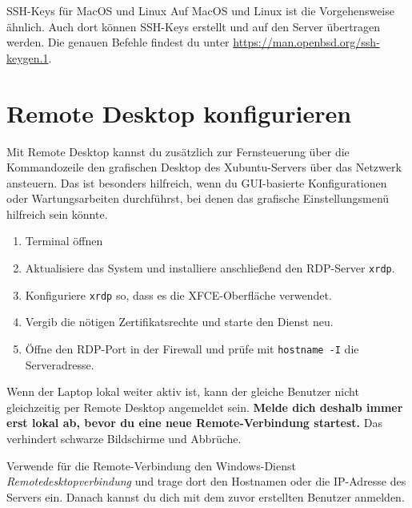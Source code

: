 \begin{InfoBox}{SSH-Keys für MacOS und Linux}
    \scriptsize Auf MacOS und Linux ist die Vorgehensweise ähnlich. Auch dort können SSH-Keys erstellt und auf den Server übertragen werden. Die genauen Befehle findest du unter \url{https://man.openbsd.org/ssh-keygen.1}.
    
\end{InfoBox}

\section{Remote Desktop konfigurieren}

Mit Remote Desktop kannst du zusätzlich zur Fernsteuerung über die Kommandozeile den grafischen Desktop des Xubuntu-Servers über das Netzwerk ansteuern. Das ist besonders hilfreich, wenn du GUI-basierte Konfigurationen oder Wartungsarbeiten durchführst, bei denen das grafische Einstellungsmenü hilfreich sein könnte.

\begin{enumerate}
    \item Terminal öffnen
    \item Aktualisiere das System und installiere anschließend den RDP-Server \texttt{xrdp}.
    \item Konfiguriere \texttt{xrdp} so, dass es die XFCE-Oberfläche verwendet. 
    \item Vergib die nötigen Zertifikatsrechte und starte den Dienst neu.
    \item Öffne den RDP-Port in der Firewall und prüfe mit \texttt{hostname -I} die Serveradresse.
\end{enumerate}


Wenn der Laptop lokal weiter aktiv ist, kann der gleiche Benutzer nicht gleichzeitig per Remote Desktop angemeldet sein. \textbf{Melde dich deshalb immer erst lokal ab, bevor du eine neue Remote-Verbindung startest.} Das verhindert schwarze Bildschirme und Abbrüche.

Verwende für die Remote-Verbindung den Windows-Dienst \emph{Remotedesktopverbindung} und trage dort den Hostnamen oder die IP-Adresse des Servers ein. Danach kannst du dich mit dem zuvor erstellten Benutzer anmelden.



